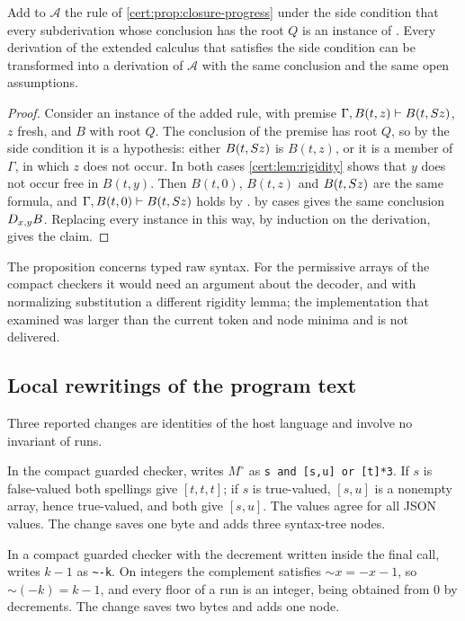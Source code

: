 \begin{proposition}\label{cert:prop:typed-repair}
Add to $\mathcal A$ the rule of \cref{cert:prop:closure-progress} under the
side condition that every subderivation whose conclusion has the root $Q$ is
an instance of . Every derivation of the extended calculus that
satisfies the side condition can be transformed into a derivation of
$\mathcal A$ with the same conclusion and the same open assumptions.
\end{proposition}
\begin{proof}
Consider an instance of the added rule, with premise
$\Gamma,B(t,z)\vdash B(t,S z)$, $z$ fresh, and $B$ with root $Q$. The
conclusion of the premise has root $Q$, so by the side condition it is a
hypothesis: either $B(t,S z)$ is $B(t,z)$, or it is a member of $\Gamma$,
in which $z$ does not occur. In both cases \cref{cert:lem:rigidity} shows that
$y$ does not occur free in $B(t,y)$. Then $B(t,0)$, $B(t,z)$ and $B(t,S z)$
are the same formula, and $\Gamma,B(t,0)\vdash B(t,S z)$ holds by
.  by cases gives the same conclusion $D_{x,y}B$.
Replacing every instance in this way, by induction on the derivation, gives
the claim.
\end{proof}

The proposition concerns typed raw syntax. For the permissive arrays of the
compact checkers it would need an argument about the decoder, and with
normalizing substitution a different rigidity lemma; the implementation that
 examined was larger than the current token and
node minima and is not delivered.

\subsection{Local rewritings of the program text}

Three reported changes are identities of the host language and involve no
invariant of runs.

In the compact guarded checker,  writes $M^{\circ}$
as \texttt{s and [s,u] or [t]*3}. If $s$ is false-valued both spellings give
$[t,t,t]$; if $s$ is true-valued, $[s,u]$ is a nonempty array, hence
true-valued, and both give $[s,u]$. The values agree for all JSON values. The
change saves one byte and adds three syntax-tree nodes.

In a compact guarded checker with the decrement written inside the final
call,  writes $k-1$ as
\texttt{\textasciitilde-k}. On integers the complement satisfies
$\mathord{\sim}x=-x-1$, so $\mathord{\sim}(-k)=k-1$, and every floor of a run
is an integer, being obtained from $0$ by decrements. The change saves two
bytes and adds one node.

